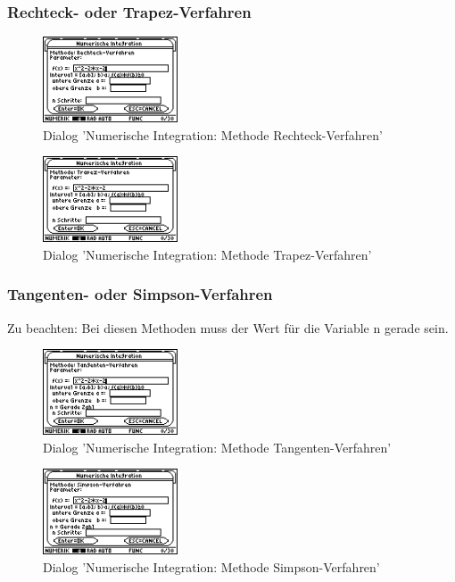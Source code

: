 \documentclass[
	a4paper							%
	,12pt							%
	,twoside						%
	,openright						%
]{scrreprt}							%
\begin{document}
\subsubsection*{Rechteck- oder Trapez-Verfahren}
\begin{figure}[h]
  \centering
  \includegraphics[width=4cm]{img/nummeth_image024.png}
  \caption{Dialog 'Numerische Integration: Methode Rechteck-Verfahren'}
  \label{fig:ParameterIntegrationRechteck}
\end{figure}
\begin{figure}[h]
  \centering
  \includegraphics[width=4cm]{img/nummeth_image026.png}
  \caption{Dialog 'Numerische Integration: Methode Trapez-Verfahren'}
  \label{fig:ParameterIntegrationTrapez}
\end{figure}

\subsubsection*{Tangenten- oder Simpson-Verfahren}
Zu beachten: Bei diesen Methoden muss der Wert f\"ur die Variable n gerade sein.
\begin{figure}[h]
  \centering
  \includegraphics[width=4cm]{img/nummeth_image028.png}
  \caption{Dialog 'Numerische Integration: Methode Tangenten-Verfahren'}
  \label{fig:ParameterIntegrationTangente}
\end{figure}
\begin{figure}[h]
  \centering
  \includegraphics[width=4cm]{img/nummeth_image030.png}
  \caption{Dialog 'Numerische Integration: Methode Simpson-Verfahren'}
  \label{fig:ParameterIntegrationSimpson}
\end{figure}
\end{document}
